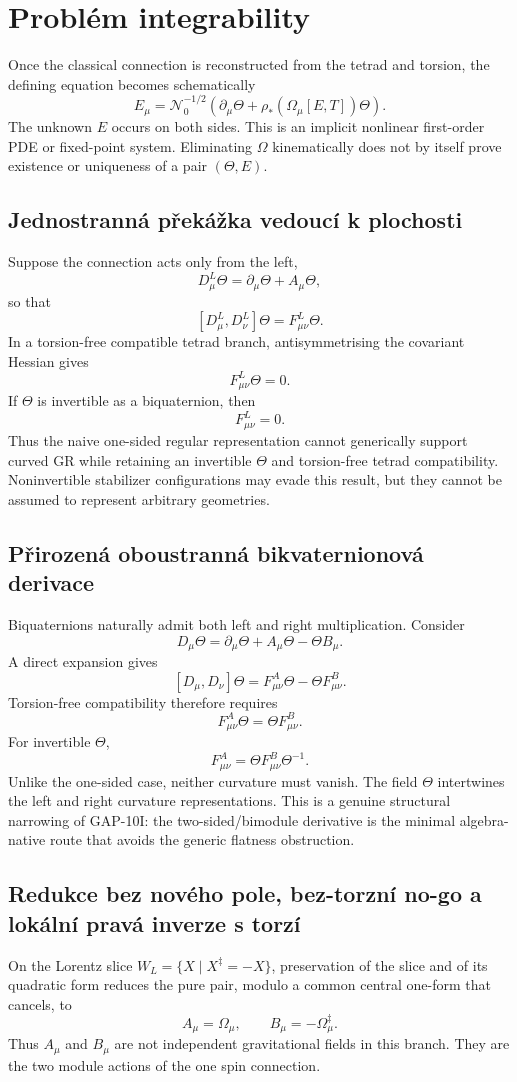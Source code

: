 \section{Problém integrability}
Once the classical connection is reconstructed from the tetrad and torsion,
the defining equation becomes schematically
\[
 E_\mu=\mathcal N_0^{-1/2}
 \left(\partial_\mu\Theta+\rho_*(\Omega_\mu[E,T])\Theta\right).
\]
The unknown $E$ occurs on both sides.  This is an implicit nonlinear first-order
PDE or fixed-point system.  Eliminating $\Omega$ kinematically does not by
itself prove existence or uniqueness of a pair $(\Theta,E)$.

\subsection{Jednostranná překážka vedoucí k plochosti}
Suppose the connection acts only from the left,
\[
 D^L_\mu\Theta=\partial_\mu\Theta+A_\mu\Theta,
\]
so that
\[
 [D^L_\mu,D^L_\nu]\Theta=F^L_{\mu\nu}\Theta.
\]
In a torsion-free compatible tetrad branch, antisymmetrising the covariant
Hessian gives
\[
 F^L_{\mu\nu}\Theta=0.
\]
If $\Theta$ is invertible as a biquaternion, then
\[
 F^L_{\mu\nu}=0.
\]
Thus the naive one-sided regular representation cannot generically support
curved GR while retaining an invertible $\Theta$ and torsion-free tetrad
compatibility.  Noninvertible stabilizer configurations may evade this result,
but they cannot be assumed to represent arbitrary geometries.

\subsection{Přirozená oboustranná bikvaternionová derivace}
Biquaternions naturally admit both left and right multiplication.  Consider
\[
 \boxed{
 D_\mu\Theta=\partial_\mu\Theta+A_\mu\Theta-\Theta B_\mu.}
\]
A direct expansion gives
\[
 \boxed{
 [D_\mu,D_\nu]\Theta
 =F^A_{\mu\nu}\Theta-\Theta F^B_{\mu\nu}.}
\]
Torsion-free compatibility therefore requires
\[
 F^A_{\mu\nu}\Theta=\Theta F^B_{\mu\nu}.
\]
For invertible $\Theta$,
\[
 \boxed{
 F^A_{\mu\nu}=\Theta F^B_{\mu\nu}\Theta^{-1}.}
\]
Unlike the one-sided case, neither curvature must vanish.  The field $\Theta$
intertwines the left and right curvature representations.  This is a genuine
structural narrowing of GAP-10I: the two-sided/bimodule derivative is the
minimal algebra-native route that avoids the generic flatness obstruction.

\subsection{Redukce bez nového pole, bez-torzní no-go a lokální pravá inverze s torzí}
On the Lorentz slice $W_L=\{X\mid X^\ddagger=-X\}$, preservation of the slice
and of its quadratic form reduces the pure pair, modulo a common central
one-form that cancels, to
\[
 \boxed{A_\mu=\Omega_\mu,\qquad B_\mu=-\Omega_\mu^\ddagger.}
\]
Thus $A_\mu$ and $B_\mu$ are not independent gravitational fields in this
branch.  They are the two module actions of the one spin connection.

